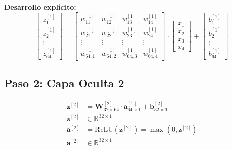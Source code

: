 \documentclass[12pt]{article}
\begin{document}
\textbf{Desarrollo explícito:}
\begin{equation}
\begin{bmatrix}
z^{[1]}_1 \\ z^{[1]}_2 \\ \vdots \\ z^{[1]}_{64}
\end{bmatrix}
=
\begin{bmatrix}
w^{[1]}_{11} & w^{[1]}_{12} & w^{[1]}_{13} & w^{[1]}_{14} \\
w^{[1]}_{21} & w^{[1]}_{22} & w^{[1]}_{23} & w^{[1]}_{24} \\
\vdots & \vdots & \vdots & \vdots \\
w^{[1]}_{64,1} & w^{[1]}_{64,2} & w^{[1]}_{64,3} & w^{[1]}_{64,4}
\end{bmatrix}
\cdot
\begin{bmatrix}
x_1 \\ x_2 \\ x_3 \\ x_4
\end{bmatrix}
+
\begin{bmatrix}
b^{[1]}_1 \\ b^{[1]}_2 \\ \vdots \\ b^{[1]}_{64}
\end{bmatrix}
\end{equation}

\subsection{Paso 2: Capa Oculta 2}

\begin{align}
\mathbf{z}^{[2]} &= \mathbf{W}^{[2]}_{32 \times 64} \cdot \mathbf{a}^{[1]}_{64 \times 1} + \mathbf{b}^{[2]}_{32 \times 1} \\
\mathbf{z}^{[2]} &\in \mathbb{R}^{32 \times 1} \\
\mathbf{a}^{[2]} &= \text{ReLU}(\mathbf{z}^{[2]}) = \max(0, \mathbf{z}^{[2]}) \\
\mathbf{a}^{[2]} &\in \mathbb{R}^{32 \times 1}
\end{align}
\end{document}
